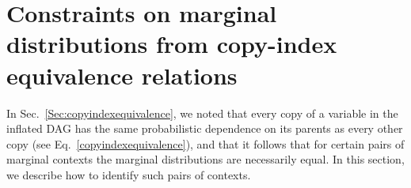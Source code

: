 \section{Constraints on marginal distributions from copy-index equivalence relations}\label{sec:coincidingdetails}



In Sec.~\ref{Sec:copyindexequivalence}, we noted that every copy of a variable in the inflated DAG has the same probabilistic dependence on its parents as every other copy (see Eq.~\eqref{copyindexequivalence}), and that it follows that for certain pairs of marginal contexts the marginal distributions are necessarily equal.  In this section, we describe how to identify such pairs of contexts. 


